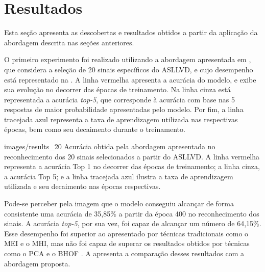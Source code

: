 

\section{Resultados} %
\label{sec:resultados}


Esta seção apresenta as descobertas e resultados obtidos a partir da aplicação da abordagem descrita nas seções anteriores. 

O primeiro experimento foi realizado utilizando a abordagem apresentada em \cite{lim-2016}, que considera a seleção de 20 sinais específicos do ASLLVD, e cujo desempenho está representado na . A linha vermelha apresenta a acurácia do modelo, e exibe sua evolução no decorrer das épocas de treinamento. Na linha cinza está representada a acurácia \textit{top-5}, que corresponde à acurácia com base nas 5 respostas de maior probabilidade apresentadas pelo modelo. Por fim, a linha tracejada azul representa a taxa de aprendizagem utilizada nas respectivas épocas, bem como seu decaimento durante o treinamento.

    {images/results_20}
    {Acurácia obtida pela abordagem apresentada no reconhecimento dos 20 sinais selecionados a partir do ASLLVD. A linha vermelha representa a acurácia Top 1 no decorrer das épocas de treinamento; a linha cinza, a acurácia Top 5; e a linha tracejada azul ilustra a taxa de aprendizagem utilizada e seu decaimento nas épocas respectivas.}

Pode-se perceber pela imagem que o modelo conseguiu alcançar de forma consistente uma acurácia de 35,85\% a partir da época 400 no reconhecimento dos sinais. A acurácia \textit{top-5}, por sua vez, foi capaz de alcançar um número de 64,15\%. Esse desempenho foi superior ao apresentado por técnicas tradicionais como o MEI e o MHI, mas não foi capaz de superar os resultados obtidos por técnicas como o PCA e o BHOF \cite{lim-2016}. A  apresenta a comparação desses resultados com a abordagem proposta.


